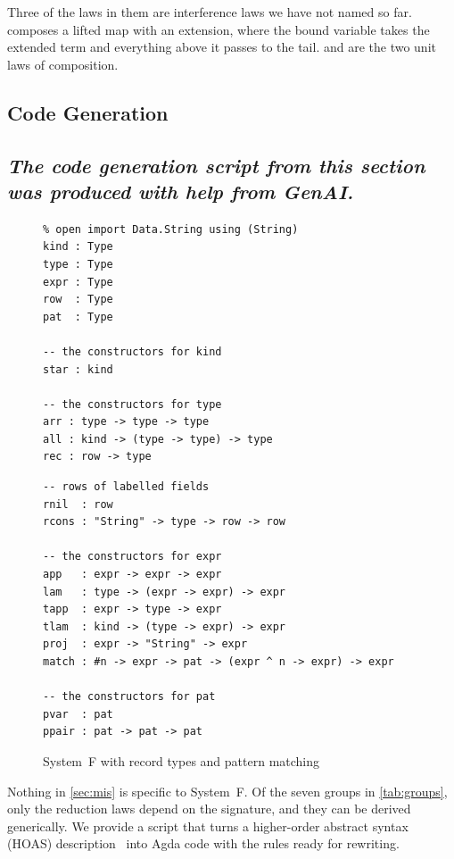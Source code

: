 \documentclass[sigplan,anonymous,review]{acmart}
\newcommand{\ag}[1]{\AgdaFunction{#1}}
\theoremstyle{acmdefinition}
\begin{document}
Three of the laws in them are interference
laws we have not named so far.
\ag{lift-cons} composes a lifted map with an extension, where the bound
variable takes the extended term and everything above it passes to the tail.
\ag{comp-idₗ} and \ag{comp-idᵣ} are the two unit laws of composition.

\subsection{Code Generation}\label{sec:gen}
\subsection*{\emph{The code generation script from this section was produced with help from  GenAI.}}

\begin{figure}[!t]
  \begin{minipage}[t]{0.48\linewidth}
    \begin{verbatim}
% open import Data.String using (String)
kind : Type
type : Type
expr : Type
row  : Type
pat  : Type

-- the constructors for kind
star : kind

-- the constructors for type
arr : type -> type -> type
all : kind -> (type -> type) -> type
rec : row -> type
    \end{verbatim}
  \end{minipage}
  \begin{minipage}[t]{0.48\linewidth}
    \begin{verbatim}
-- rows of labelled fields
rnil  : row
rcons : "String" -> type -> row -> row

-- the constructors for expr
app   : expr -> expr -> expr
lam   : type -> (expr -> expr) -> expr
tapp  : expr -> type -> expr
tlam  : kind -> (type -> expr) -> expr
proj  : expr -> "String" -> expr
match : #n -> expr -> pat -> (expr ^ n -> expr) -> expr

-- the constructors for pat
pvar  : pat
ppair : pat -> pat -> pat
    \end{verbatim}
  \end{minipage}
  \caption{System~F with record types and pattern
    matching}\label{fig:rel-hoa}
\end{figure}

Nothing in \cref{sec:mis} is specific to System~F. Of the seven groups in
\cref{tab:groups}, only the reduction laws depend on the signature, and they
can be derived generically. We provide a script that turns a higher-order
abstract syntax (HOAS) description~\cite{schafer2015autosubst} into Agda code
with the rules ready for rewriting.
\end{document}
